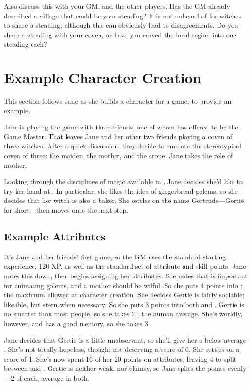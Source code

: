 Also discuss this with your GM, and the other players.
Has the GM already described a village that could be your steading?
It is not unheard of for witches to share a steading, although this can obviously lead to disagreements.
Do you share a steading with your coven, or have you carved the local region into one steading each?

\section{Example Character Creation}

This section follows Jane as she builds a character for a game, to provide an example.

Jane is playing the game with three friends, one of whom has offered to be the Game Master.
That leaves Jane and her other two friends playing a coven of three witches.
After a quick discussion, they decide to emulate the stereotypical coven of three: the maiden, the mother, and the crone.
Jane takes the role of mother.

Looking through the disciplines of magic available in , Jane decides she'd like to try her hand at .
In particular, she likes the idea of gingerbread golems, so she decides that her witch is also a baker.
She settles on the name Gertrude---Gertie for short---then moves onto the next step.

\subsection{Example Attributes}

It's Jane and her friends' first game, so the GM uses the standard starting experience, 120 XP, as well as the standard set of attribute and skill points.
Jane notes this down, then begins assigning her attributes.
She notes that  is important for animating golems, and a mother should be wilful.
So she puts 4 points into ; the maximum allowed at character creation.
She decides Gertie is fairly sociable; likeable, but stern when necessary.
So she puts 3 points into both  and .
Gertie is no smarter than most people, so she takes 2 ; the human average.
She's worldly, however, and has a good memory, so she takes 3 .

Jane decides that Gertie is a little unobservant, so she'll give her a below-average .
She's not totally hopeless, though; not deserving a score of 0.
She settles on a score of 1.
She's now spent 16 of her 20 points on attributes, leaving 4 to split between  and .
Gertie is neither weak, nor clumsy, so Jane splits the points evenly---2 of each, average in both.

